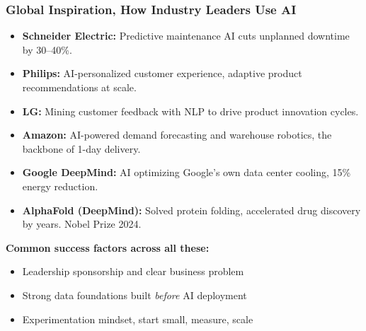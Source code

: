 \begin{frame}[fragile]\frametitle{Global Inspiration, How Industry Leaders Use AI}

\begin{itemize}
  \item \textbf{Schneider Electric:} Predictive maintenance AI cuts unplanned downtime by 30--40\%.
  \item \textbf{Philips:} AI-personalized customer experience, adaptive product recommendations at scale.
  \item \textbf{LG:} Mining customer feedback with NLP to drive product innovation cycles.
  \item \textbf{Amazon:} AI-powered demand forecasting and warehouse robotics, the backbone of 1-day delivery.
  \item \textbf{Google DeepMind:} AI optimizing Google's own data center cooling, 15\% energy reduction.
  \item \textbf{AlphaFold (DeepMind):} Solved protein folding, accelerated drug discovery by years. Nobel Prize 2024.
\end{itemize}

\textbf{Common success factors across all these:}
\begin{itemize}
  \item Leadership sponsorship and clear business problem
  \item Strong data foundations built \textit{before} AI deployment
  \item Experimentation mindset, start small, measure, scale
\end{itemize}

\end{frame}

